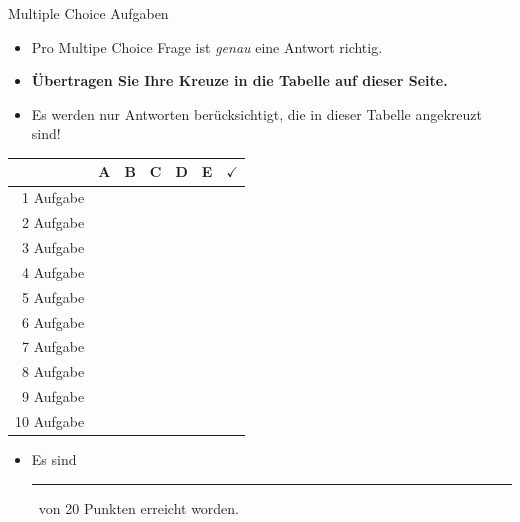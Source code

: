 \documentclass[a4paper, 9pt]{scrartcl}\usepackage[]{graphicx}\usepackage[]{xcolor}
\begin{document}
\begin{graybox}{Multiple Choice Aufgaben}
  \begin{itemize}
  \item Pro Multipe Choice Frage ist \emph{genau} eine Antwort richtig.
  \item \textbf{{\"U}bertragen Sie Ihre Kreuze in die Tabelle auf
      dieser Seite.}
  \item Es werden nur Antworten ber{\"u}cksichtigt, die in dieser Tabelle
    angekreuzt sind!
  \end{itemize}

\begin{center}
  \large
  \begin{tabular}{|r|c|c|c|c|c||c|}
    \hline
    & \textbf{A} & \textbf{B} & \textbf{C} & \textbf{D} & \textbf{E} & $\boldsymbol{\checkmark}$\strut\\
    \hline
    1 Aufgabe &   &   &   &   &   & \strut\\
    \hline
    2 Aufgabe &   &   &   &   &   & \strut\\
    \hline
    3 Aufgabe &   &   &   &   &   & \strut\\
    \hline
    4 Aufgabe &   &   &   &   &   & \strut\\
    \hline
    5 Aufgabe &   &   &   &   &   & \strut\\
    \hline
    6 Aufgabe &   &   &   &   &   & \strut\\
    \hline
    7 Aufgabe &   &   &   &   &   & \strut\\
    \hline
    8 Aufgabe &   &   &   &   &   & \strut\\
    \hline
    9 Aufgabe &   &   &   &   &   & \strut\\
    \hline
    10 Aufgabe &   &   &   &   &   & \strut\\
    \hline
  \end{tabular}
\end{center}

\begin{itemize}
\item Es sind \rule[0ex]{2em}{.4pt}\, von 20 Punkten erreicht worden.
\end{itemize}
\end{graybox}

\vfill
\end{document}
